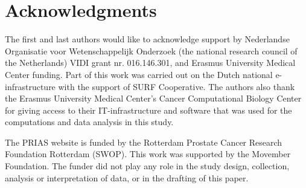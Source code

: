 \section*{Acknowledgments}
The first and last authors would like to acknowledge support by Nederlandse Organisatie voor Wetenschappelijk Onderzoek (the national research council of the Netherlands) VIDI grant nr. 016.146.301, and Erasmus University Medical Center funding. Part of this work was carried out on the Dutch national e-infrastructure with the support of SURF Cooperative. The authors also thank the Erasmus University Medical Center's Cancer Computational Biology Center for giving access to their IT-infrastructure and software that was used for the computations and data analysis in this study.

The PRIAS website is funded by the Rotterdam Prostate Cancer Research Foundation Rotterdam (SWOP). This work was supported by the Movember Foundation. The funder did not play any role in the study design, collection, analysis or interpretation of data, or in the drafting of this paper.